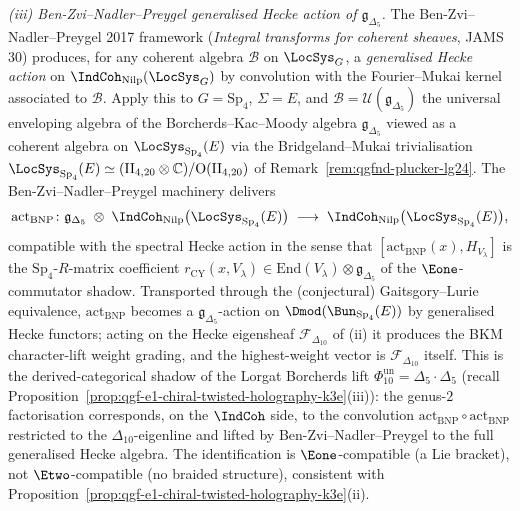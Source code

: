 \begin{proposition}
\emph{(iii) Ben-Zvi--Nadler--Preygel generalised Hecke action of
$\mathfrak g_{\Delta_5}$.} The Ben-Zvi--Nadler--Preygel 2017 framework
(\emph{Integral transforms for coherent sheaves}, JAMS 30) produces,
for any coherent algebra $\mathcal B$ on $\LocSys_G$, a \emph{generalised
Hecke action} on $\IndCoh_{\mathrm{Nilp}}(\LocSys_G)$ by convolution
with the Fourier--Mukai kernel associated to $\mathcal B$. Apply this
to $G=\mathrm{Sp}_4$, $\Sigma=E$, and
$\mathcal B=\mathcal U(\mathfrak g_{\Delta_5})$ the universal
enveloping algebra of the Borcherds--Kac--Moody algebra
$\mathfrak g_{\Delta_5}$ viewed as a coherent algebra on
$\LocSys_{\mathrm{Sp}_4}(E)$ via the Bridgeland--Mukai trivialisation
$\LocSys_{\mathrm{Sp}_4}(E)\simeq(\mathrm{II}_{4,20}\otimes\mathbb C)/
\mathrm{O}(\mathrm{II}_{4,20})$ of
Remark~\ref{rem:qgfnd-plucker-lg24}. The Ben-Zvi--Nadler--Preygel
machinery delivers
\[
 \mathrm{act}_{\mathrm{BNP}}\colon
 \mathfrak g_{\Delta_5}\;\otimes\;
 \IndCoh_{\mathrm{Nilp}}\bigl(\LocSys_{\mathrm{Sp}_4}(E)\bigr)
 \;\longrightarrow\;
 \IndCoh_{\mathrm{Nilp}}\bigl(\LocSys_{\mathrm{Sp}_4}(E)\bigr),
\]
compatible with the spectral Hecke action in the sense that
$[\mathrm{act}_{\mathrm{BNP}}(x),H_{V_\lambda}]$ is the
$\mathrm{Sp}_4$-$R$-matrix coefficient
$r_{\mathrm{CY}}(x,V_\lambda)\in\mathrm{End}(V_\lambda)\otimes
\mathfrak g_{\Delta_5}$ of the $\Eone$-commutator shadow.
Transported through the (conjectural) Gaitsgory--Lurie equivalence,
$\mathrm{act}_{\mathrm{BNP}}$ becomes a $\mathfrak g_{\Delta_5}$-action
on $\Dmod(\Bun_{\mathrm{Sp}_4}(E))$ by generalised Hecke
functors; acting on the Hecke eigensheaf $\mathcal F_{\Delta_{10}}$
of (ii) it produces the BKM character-lift weight grading, and the
highest-weight vector is $\mathcal F_{\Delta_{10}}$ itself. This is
the derived-categorical shadow of the Lorgat Borcherds lift
$\Phi_{10}^{\mathrm{un}}=\Delta_5\cdot\Delta_5$ (recall
Proposition~\ref{prop:qgf-e1-chiral-twisted-holography-k3e}(iii)): the
genus-$2$ factorisation corresponds, on the $\IndCoh$ side, to the
convolution $\mathrm{act}_{\mathrm{BNP}}\circ
\mathrm{act}_{\mathrm{BNP}}$ restricted to the $\Delta_{10}$-eigenline
and lifted by Ben-Zvi--Nadler--Preygel to the full generalised Hecke
algebra. The identification is $\Eone$-compatible (a Lie bracket),
not $\Etwo$-compatible (no braided structure), consistent with
Proposition~\ref{prop:qgf-e1-chiral-twisted-holography-k3e}(ii).


\end{proposition}
